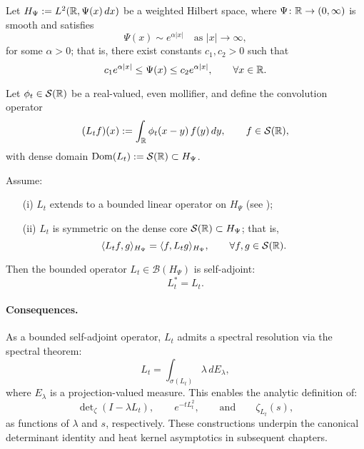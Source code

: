 \begin{proposition}
\label{prop:selfadjointness_Lt}
Let \( H_\Psi := L^2(\mathbb{R}, \Psi(x)\, dx) \) be a weighted Hilbert space, where \( \Psi \colon \mathbb{R} \to (0,\infty) \) is smooth and satisfies
\[
\Psi(x) \sim e^{\alpha|x|} \quad \text{as } |x| \to \infty,
\]
for some \( \alpha > 0 \); that is, there exist constants \( c_1, c_2 > 0 \) such that
\[
c_1 e^{\alpha |x|} \le \Psi(x) \le c_2 e^{\alpha |x|}, \qquad \forall x \in \mathbb{R}.
\]

Let \( \phi_t \in \mathcal{S}(\mathbb{R}) \) be a real-valued, even mollifier, and define the convolution operator
\[
(L_t f)(x) := \int_{\mathbb{R}} \phi_t(x - y)\, f(y)\, dy, \qquad f \in \mathcal{S}(\mathbb{R}),
\]
with dense domain \( \operatorname{Dom}(L_t) := \mathcal{S}(\mathbb{R}) \subset H_\Psi \).

Assume:
\begin{itemize}
    \item[\textup{(i)}] \( L_t \) extends to a bounded linear operator on \( H_\Psi \) (see );
    \item[\textup{(ii)}] \( L_t \) is symmetric on the dense core \( \mathcal{S}(\mathbb{R}) \subset H_\Psi \); that is,
    \[
    \langle L_t f, g \rangle_{H_\Psi} = \langle f, L_t g \rangle_{H_\Psi}, \qquad \forall f, g \in \mathcal{S}(\mathbb{R}).
    \]
\end{itemize}

Then the bounded operator \( L_t \in \mathcal{B}(H_\Psi) \) is self-adjoint:
\[
L_t^* = L_t.
\]

\paragraph{Consequences.}
As a bounded self-adjoint operator, \( L_t \) admits a spectral resolution via the spectral theorem:
\[
L_t = \int_{\sigma(L_t)} \lambda\, dE_\lambda,
\]
where \( E_\lambda \) is a projection-valued measure. This enables the analytic definition of:
\[
\det\nolimits_\zeta(I - \lambda L_t), \qquad e^{-t L_t^2}, \qquad \text{and} \qquad \zeta_{L_t}(s),
\]
as functions of \( \lambda \) and \( s \), respectively. These constructions underpin the canonical determinant identity and heat kernel asymptotics in subsequent chapters.
\end{proposition}

